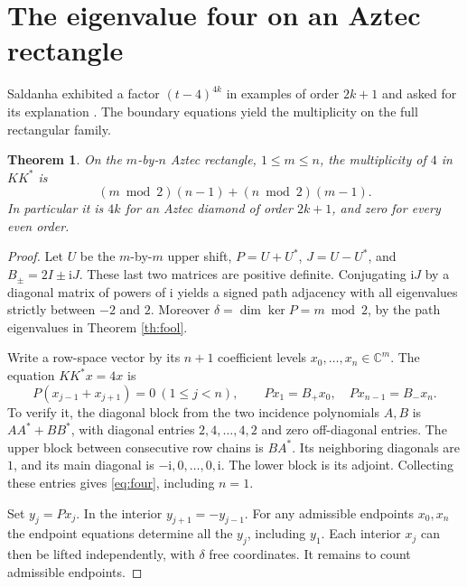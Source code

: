 \documentclass[11pt,letterpaper]{article}
\newtheorem{theorem}{Theorem}[section]
\newcommand{\ii}{\mathrm i}
\newcommand{\C}{\mathbb C}
\begin{document}
\clearpage
\section{The eigenvalue four on an Aztec rectangle}
Saldanha exhibited a factor \((t-4)^{4k}\) in examples of order \(2k+1\) and asked for its explanation \cite[\S6]{saldanha}. The boundary equations yield the multiplicity on the full rectangular family.
\begin{theorem}\label{th:four}
On the \(m\)-by-\(n\) Aztec rectangle, \(1\le m\le n\), the multiplicity of \(4\) in \(KK^*\) is
\[
 (m\bmod2)(n-1)+(n\bmod2)(m-1).
\]
In particular it is \(4k\) for an Aztec diamond of order \(2k+1\), and zero for every even order.
\end{theorem}
\begin{proof}
Let \(U\) be the \(m\)-by-\(m\) upper shift, \(P=U+U^*\), \(J=U-U^*\), and \(B_\pm=2I\pm\ii J\). These last two matrices are positive definite. Conjugating \(\ii J\) by a diagonal matrix of powers of \(\ii\) yields a signed path adjacency with all eigenvalues strictly between \(-2\) and \(2\). Moreover \(\delta=\dim\ker P=m\bmod2\), by the path eigenvalues in Theorem \ref{th:fool}.

Write a row-space vector by its \(n+1\) coefficient levels \(x_0,\ldots,x_n\in\C^m\). The equation \(KK^*x=4x\) is
\begin{equation}\label{eq:four}
 P(x_{j-1}+x_{j+1})=0\ (1\le j<n),\qquad
 Px_1=B_+x_0,\quad Px_{n-1}=B_-x_n .
\end{equation}
To verify it, the diagonal block from the two incidence polynomials \(A,B\) is \(AA^*+BB^*\), with diagonal entries \(2,4,\ldots,4,2\) and zero off-diagonal entries. The upper block between consecutive row chains is \(BA^*\). Its neighboring diagonals are \(1\), and its main diagonal is \(-\ii,0,\ldots,0,\ii\). The lower block is its adjoint. Collecting these entries gives \eqref{eq:four}, including \(n=1\).

Set \(y_j=Px_j\). In the interior \(y_{j+1}=-y_{j-1}\). For any admissible endpoints \(x_0,x_n\) the endpoint equations determine all the \(y_j\), including \(y_1\). Each interior \(x_j\) can then be lifted independently, with \(\delta\) free coordinates. It remains to count admissible endpoints.


\end{proof}
\end{document}
